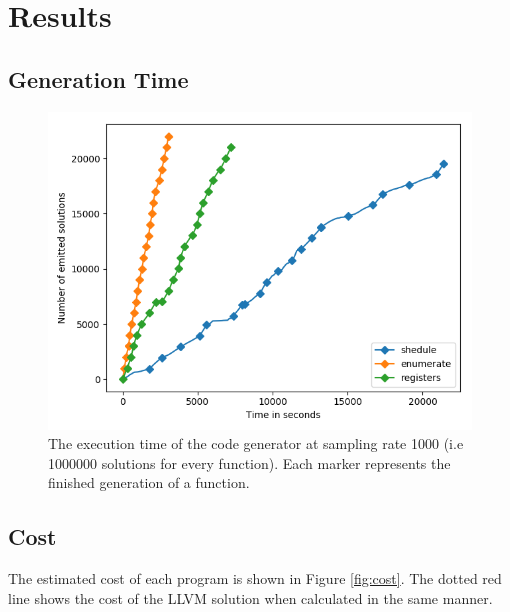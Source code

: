 \chapter{Results}

\section{Generation Time}

\begin{figure}[h]
	\centering
	\includegraphics[width=\textwidth,height=0.5\textheight]{results/figures/generator_time}
	\caption{The execution time of the code generator at sampling rate 1000 (i.e 1000000 solutions for every function). Each marker represents the finished generation of a function.}
	\label{fig:time}
\end{figure}

\section{Cost}

The estimated cost of each program is shown in Figure \ref{fig:cost}. The dotted red line
shows the cost of the LLVM solution when calculated in the same manner.

